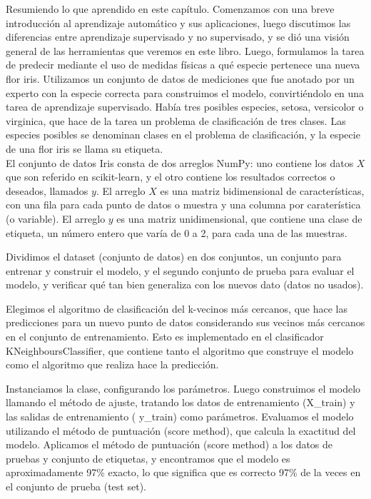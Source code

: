 Resumiendo lo que aprendido en este capítulo. Comenzamos con una breve introducción
al aprendizaje automático y sus aplicaciones, luego discutimos las diferencias entre
aprendizaje supervisado y no supervisado, y se dió una visión general de las herramientas que veremos
en este libro. Luego, formulamos la tarea de predecir  mediante el uso de medidas físicas  a qué especie  pertenece una nueva flor iris.  Utilizamos un conjunto de datos de mediciones que fue anotado por un experto con la especie correcta para construimos el modelo, convirtiéndolo en una tarea de aprendizaje supervisado. Había tres posibles especies, setosa, versicolor o virginica, que hace de la tarea un problema de clasificación de tres clases. Las especies posibles se denominan clases en el problema de clasificación, y la especie de una flor iris se llama su etiqueta. \\


El conjunto de datos Iris consta de dos arreglos {\ttfamily NumPy}: uno  contiene los datos  $X$  que son
referido  en {\ttfamily scikit-learn}, y el otro contiene los resultados correctos o deseados, llamados $y$.
El arreglo $X$ es una matriz bidimensional de características, con una fila para cada punto de datos o muestra y una columna por caraterística (o variable). El arreglo $y$ es una matriz unidimensional, que  contiene una clase de etiqueta, un número entero que varía de 0 a 2, para cada una de las muestras.


Dividimos el dataset (conjunto de datos) en dos conjuntos, un conjunto para entrenar y construir el modelo, y el segundo conjunto de prueba para evaluar el modelo, y verificar qué tan bien  generaliza con los nuevos dato (datos no usados).


Elegimos el algoritmo de clasificación del k-vecinos más cercanos,  que hace las predicciones 
para un nuevo punto de datos considerando sus vecinos más cercanos en el conjunto de entrenamiento.  Esto es  implementado en el clasificador {\ttfamily  KNeighboursClassifier}, que contiene tanto el algoritmo que 
construye el modelo como   el algoritmo que realiza hace la predicción.


Instanciamos la clase, configurando los parámetros. Luego construimos el modelo llamando el
método de ajuste, tratando los datos de entrenamiento ({\ttfamily X\_train}) y las salidas de entrenamiento ( {\ttfamily y\_train}) como parámetros. Evaluamos el modelo utilizando el método de puntuación (score method), que calcula la exactitud  del modelo.  Aplicamos el método de puntuación (score method) a los datos de pruebas y conjunto de etiquetas, y encontramos que el modelo es aproximadamente 97\% exacto, lo que significa que es correcto 97\%  de la veces en el conjunto de prueba (test set).\\

